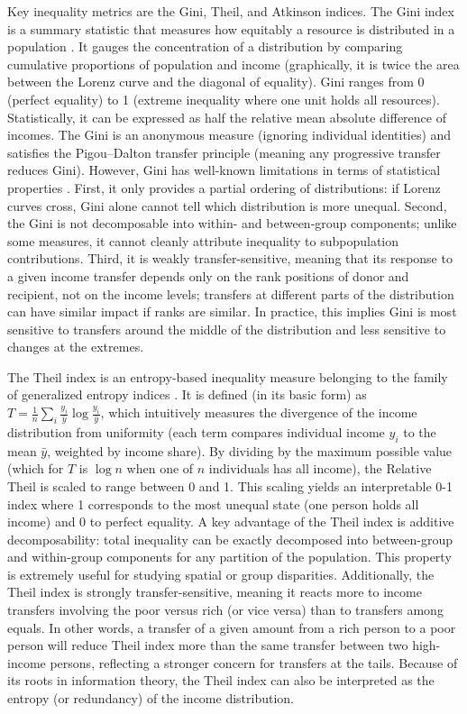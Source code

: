 \documentclass[11pt]{article}
\begin{document}
Key inequality metrics are the Gini, Theil, and Atkinson indices. The Gini index is a summary statistic that measures how equitably a resource is distributed in a population \citep{farris2010gini}. It gauges the concentration of a distribution by comparing cumulative proportions of population and income (graphically, it is twice the area between the Lorenz curve and the diagonal of equality). Gini ranges from 0 (perfect equality) to 1 (extreme inequality where one unit holds all resources). Statistically, it can be expressed as half the relative mean absolute difference of incomes. The Gini is an anonymous measure (ignoring individual identities) and satisfies the Pigou–Dalton transfer principle (meaning any progressive transfer reduces Gini). However, Gini has well-known limitations in terms of statistical properties \citep{osberg2017limitations}. First, it only provides a partial ordering of distributions: if Lorenz curves cross, Gini alone cannot tell which distribution is more unequal. Second, the Gini is not decomposable into within- and between-group components; unlike some measures, it cannot cleanly attribute inequality to subpopulation contributions. Third, it is weakly transfer-sensitive, meaning that its response to a given income transfer depends only on the rank positions of donor and recipient, not on the income levels; transfers at different parts of the distribution can have similar impact if ranks are similar. In practice, this implies Gini is most sensitive to transfers around the middle of the distribution and less sensitive to changes at the extremes. 

The Theil index is an entropy-based inequality measure belonging to the family of generalized entropy indices \citep{maria2017theil}. It is defined (in its basic form) as $T = \frac{1}{n}\sum_i \frac{y_i}{\bar{y}}\log\frac{y_i}{\bar{y}}$, which intuitively measures the divergence of the income distribution from uniformity (each term compares individual income $y_i$ to the mean $\bar{y}$, weighted by income share). By dividing by the maximum possible value (which for $T$ is $\log n$ when one of $n$ individuals has all income), the Relative Theil is scaled to range between 0 and 1. This scaling yields an interpretable 0-1 index where 1 corresponds to the most unequal state (one person holds all income) and 0 to perfect equality. A key advantage of the Theil index is additive decomposability: total inequality can be exactly decomposed into between-group and within-group components for any partition of the population. This property is extremely useful for studying spatial or group disparities. Additionally, the Theil index is strongly transfer-sensitive, meaning it reacts more to income transfers involving the poor versus rich (or vice versa) than to transfers among equals. In other words, a transfer of a given amount from a rich person to a poor person will reduce Theil index more than the same transfer between two high-income persons, reflecting a stronger concern for transfers at the tails. Because of its roots in information theory, the Theil index can also be interpreted as the entropy (or redundancy) of the income distribution.
\end{document}
